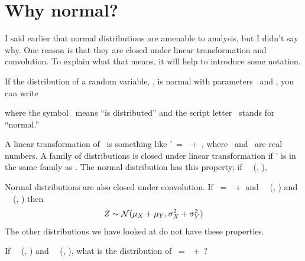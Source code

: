 \documentclass[12pt]{book}
\begin{document}
\section{Why normal?}
\label{why_normal}

I said earlier that normal distributions are amenable to analysis,
but I didn't say why.  One reason is that they are
closed under linear transformation and convolution.  To explain what
that means, it will help to introduce some notation.

If the distribution of a random variable, \X, is
normal with parameters \mymu~and \mysigma, you can write

\Eqn{ \X~\mysim~\mynormal (\mymu, \mysigma) }

where the symbol \mysim~means ``is distributed'' and the script letter
\mynormal~stands for ``normal.''


A linear transformation of \X~is something like \X'~=~\mya \X~+~\myb, where
\mya~and \myb~are real numbers.
A family of distributions is closed under
linear transformation if \X' is in the same family as \X.  The normal
distribution has this property; if \X~\mysim~\mynormal (\mymu,
\sigmasq),


Normal distributions are also closed under convolution.  
If \Z~=~\X~+~\Y and
\X~\mysim~\mynormal (\mymu{}, \mysigma{}) and
\Y~\mysim~\mynormal (\mymu{}, \mysigma{}) then
%
\[ Z \sim \mathcal{N} (\mu_X + \mu_Y, \sigma_X^2 + \sigma_Y^2) \]
%
The other distributions we have looked at do not have these
properties.

\begin{exercise}
If 
\X~\mysim~\mynormal (\mymu{}, \mysigma{}) and
\Y~\mysim~\mynormal (\mymu{}, \mysigma{}), what 
is the distribution of \Z~=~\mya\X~+~\myb\Y?

\end{exercise}
\end{document}
